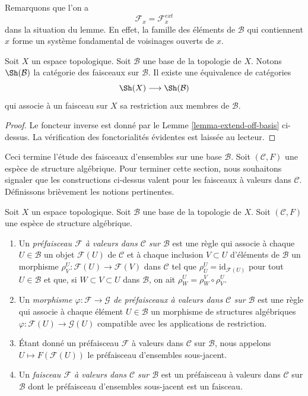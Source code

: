 \noindent
Remarquons que l'on a
$$
\mathcal{F}_x = \mathcal{F}_x^{ext}
$$
dans la situation du lemme. En effet, la
famille des éléments de $\mathcal{B}$ qui contiennent
$x$ forme un système fondamental de voisinages ouverts de $x$.

\begin{lemma}
\label{lemma-restrict-basis-equivalence}
Soit $X$ un espace topologique.
Soit $\mathcal{B}$ une base de la topologie de $X$.
Notons $\Sh(\mathcal{B})$ la catégorie des
faisceaux sur $\mathcal{B}$.
Il existe une équivalence de catégories
$$
\Sh(X) \longrightarrow \Sh(\mathcal{B})
$$
qui associe à un faisceau sur $X$ sa restriction aux
membres de $\mathcal{B}$.
\end{lemma}

\begin{proof}
Le foncteur inverse est donné par le Lemme \ref{lemma-extend-off-basis} ci-dessus.
La vérification des fonctorialités évidentes est laissée au
lecteur.
\end{proof}

\noindent
Ceci termine l'étude des faisceaux d'ensembles sur
une base $\mathcal{B}$. Soit $(\mathcal{C}, F)$ une
espèce de structure algébrique. Pour terminer cette section,
nous souhaitons signaler que les constructions
ci-dessus valent pour les faisceaux à valeurs dans $\mathcal{C}$.
Définissons brièvement les notions pertinentes.

\begin{definition}
\label{definition-sheaf-structures-basis}
Soit $X$ un espace topologique. Soit $\mathcal{B}$ une
base de la topologie de $X$. Soit $(\mathcal{C}, F)$
une espèce de structure algébrique.
\begin{enumerate}
\item Un {\it préfaisceau $\mathcal{F}$ à valeurs dans $\mathcal{C}$
sur $\mathcal{B}$} est une règle qui associe à chaque
$U \in \mathcal{B}$ un objet
$\mathcal{F}(U)$ de $\mathcal{C}$ et à chaque inclusion $V \subset U$
d'éléments de $\mathcal{B}$ un morphisme
$\rho^U_V : \mathcal{F}(U) \to \mathcal{F}(V)$ dans $\mathcal{C}$ tel que
$\rho^U_U = \text{id}_{\mathcal{F}(U)}$ pour tout $U \in \mathcal{B}$ et que,
si $W \subset V \subset U$ dans $\mathcal{B}$, on ait
$\rho^U_W = \rho^V_W \circ \rho ^U_V$.
\item Un {\it morphisme $\varphi : \mathcal{F} \to \mathcal{G}$
de préfaisceaux à valeurs dans $\mathcal{C}$
sur $\mathcal{B}$} est une règle qui associe à chaque
élément $U \in \mathcal{B}$ un morphisme de
structures algébriques $\varphi : \mathcal{F}(U) \to \mathcal{G}(U)$
compatible avec les applications de restriction.
\item Étant donné un préfaisceau $\mathcal{F}$ à valeurs dans $\mathcal{C}$
sur $\mathcal{B}$, nous appelons $U \mapsto F(\mathcal{F}(U))$ le
préfaisceau d'ensembles sous-jacent.
\item Un {\it faisceau $\mathcal{F}$ à valeurs dans $\mathcal{C}$
sur $\mathcal{B}$} est un préfaisceau à valeurs dans $\mathcal{C}$
sur $\mathcal{B}$ dont le préfaisceau d'ensembles sous-jacent est un faisceau.
\end{enumerate}
\end{definition}

